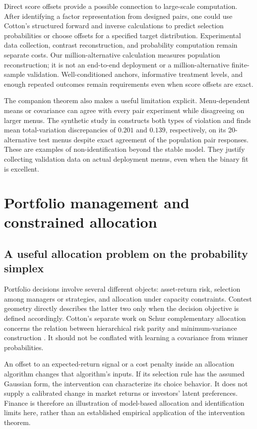 \documentclass[11pt]{amsart}
\theoremstyle{definition}
\begin{document}
Direct score offsets provide a possible connection to large-scale computation. After identifying a factor representation from designed pairs, one could use Cotton's structured forward and inverse calculations \cite{cotton2026} to predict selection probabilities or choose offsets for a specified target distribution. Experimental data collection, contrast reconstruction, and probability computation remain separate costs. Our million-alternative calculation measures population reconstruction; it is not an end-to-end deployment or a million-alternative finite-sample validation. Well-conditioned anchors, informative treatment levels, and enough repeated outcomes remain requirements even when score offsets are exact.

The companion theorem also makes a useful limitation explicit. Menu-dependent means or covariance can agree with every pair experiment while disagreeing on larger menus. The synthetic study in \cite{wuebben2026} constructs both types of violation and finds mean total-variation discrepancies of $0.201$ and $0.139$, respectively, on its 20-alternative test menus despite exact agreement of the population pair responses. These are examples of non-identification beyond the stable model. They justify collecting validation data on actual deployment menus, even when the binary fit is excellent.

\section{Portfolio management and constrained allocation}\label{sec:portfolio}

\subsection{A useful allocation problem on the probability simplex}\label{subsec:allocation}
Portfolio decisions involve several different objects: asset-return risk, selection among managers or strategies, and allocation under capacity constraints. Contest geometry directly describes the latter two only when the decision objective is defined accordingly. Cotton's separate work on Schur complementary allocation concerns the relation between hierarchical risk parity and minimum-variance construction \cite{cottonschur}. It should not be conflated with learning a covariance from winner probabilities.

An offset to an expected-return signal or a cost penalty inside an allocation algorithm changes that algorithm's inputs. If its selection rule has the assumed Gaussian form, the intervention can characterize its choice behavior. It does not supply a calibrated change in market returns or investors' latent preferences. Finance is therefore an illustration of model-based allocation and identification limits here, rather than an established empirical application of the intervention theorem.
\end{document}
